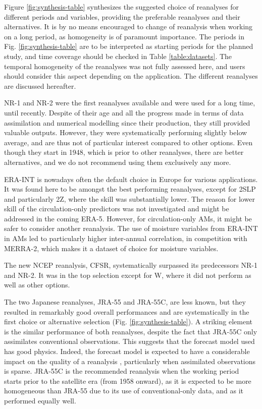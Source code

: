 \documentclass{ametsoc}
\begin{document}
Figure \ref{fig:synthesis-table} synthesizes the suggested choice of reanalyses for different periods and variables, providing the preferable reanalyses and their alternatives. It is by no means encouraged to change of reanalysis when working on a long period, as homogeneity is of paramount importance. The periods in Fig. \ref{fig:synthesis-table} are to be interpreted as starting periods for the planned study, and time coverage should be checked in Table \ref{table:datasets}. The temporal homogeneity of the reanalyses was not fully assessed here, and users should consider this aspect depending on the application. The different reanalyses are discussed hereafter.

NR-1 and NR-2 were the first reanalyses available and were used for a long time, until recently. Despite of their age and all the progress made in terms of data assimilation and numerical modelling since their production, they still provided valuable outputs. However, they were systematically performing slightly below average, and are thus not of particular interest compared to other options. Even though they start in 1948, which is prior to other reanalyses, there are better alternatives, and we do not recommend using them exclusively any more.

ERA-INT is nowadays often the default choice in Europe for various applications. It was found here to be amongst the best performing reanalyses, except for 2SLP and particularly 2Z, where the skill was substantially lower. The reason for lower skill of the circulation-only predictors was not investigated and might be addressed in the coming ERA-5. However, for circulation-only AMs, it might be safer to consider another reanalysis. The use of moisture variables from ERA-INT in AMs led to particularly higher inter-annual correlation, in competition with MERRA-2, which makes it a dataset of choice for moisture variables.

The new NCEP reanalysis, CFSR, systematically surpassed its predecessors NR-1 and NR-2. It was in the top selection except for W, where it did not perform as well as other options.

The two Japanese reanalyses, JRA-55 and JRA-55C, are less known, but they resulted in remarkably good overall performances and are systematically in the first choice or alternative selection (Fig. \ref{fig:synthesis-table}). A striking element is the similar performance of both reanalyses, despite the fact that JRA-55C only assimilates conventional observations. This suggests that the forecast model used has good physics. Indeed, the forecast model is expected to have a considerable impact on the quality of a reanalysis \citep{Kobayashi2015}, particularly when assimilated observations is sparse. JRA-55C is the recommended reanalysis when the working period starts prior to the satellite era (from 1958 onward), as it is expected to be more homogeneous than JRA-55 due to its use of conventional-only data, and as it performed equally well.
\end{document}
